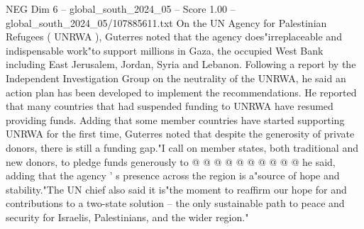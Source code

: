 \begin{textsample}{NEG Dim 6 – global\_south\_2024\_05 – Score 1.00 – global\_south\_2024\_05/107885611.txt}
On the UN Agency for Palestinian Refugees ( UNRWA ), Guterres noted that the agency does"irreplaceable and indispensable work"to support millions in Gaza, the occupied West Bank including East Jerusalem, Jordan, Syria and Lebanon.
Following a report by the Independent Investigation Group on the neutrality of the UNRWA, he said an action plan has been developed to implement the recommendations.
He reported that many countries that had suspended funding to UNRWA have resumed providing funds.
Adding that some member countries have started supporting UNRWA for the first time, Guterres noted that despite the generosity of private donors, there is still a funding gap."I call on member states, both traditional and new donors, to pledge funds generously to @ @ @ @ @ @ @ @ @ @ he said, adding that the agency ' s presence across the region is a"source of hope and stability."The UN chief also said it is"the moment to reaffirm our hope for and contributions to a two-state solution -- the only sustainable path to peace and security for Israelis, Palestinians, and the wider region."

\end{textsample}
